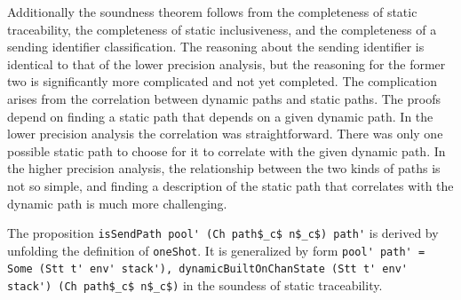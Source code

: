 \documentclass[letterpaper, 11pt]{extarticle}
\begin{document}
Additionally the soundness theorem follows from the completeness of static traceability,
the completeness of static inclusiveness, and the completeness of a sending identifier classification. 
The reasoning about the sending identifier is identical to that of the lower precision analysis, but
the reasoning for the former two is significantly more complicated and not yet completed.
The complication arises from the
correlation between dynamic paths and static paths. The proofs depend on finding a static 
path that depends on a given dynamic path. In the lower precision analysis the
correlation was straightforward. There was only one possible static path to choose for it
to correlate with the given dynamic path. In the higher precision analysis, the relationship
between the two kinds of paths is not so simple, and finding a description of the static path
that correlates with the dynamic path is much more challenging.


The proposition \lstinline{isSendPath pool' (Ch path$_c$ n$_c$) path'} is derived by unfolding the definition of \lstinline{oneShot}. It is generalized by form \lstinline{pool' path' = Some (Stt t' env' stack'), dynamicBuiltOnChanState (Stt t' env' stack') (Ch path$_c$ n$_c$)} in the soundess of static traceability.
\end{document}
